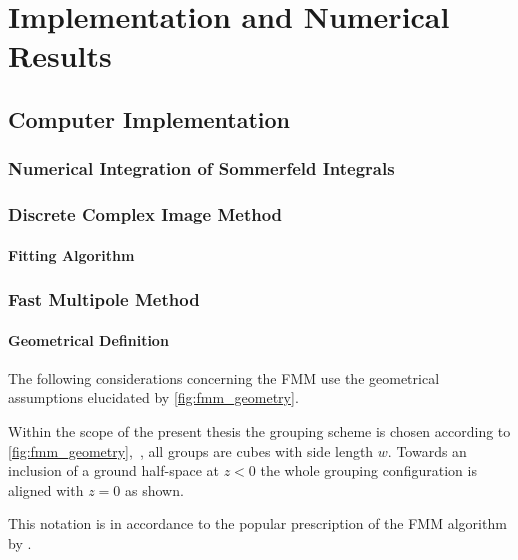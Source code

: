 \part{Implementation and Numerical Results}






\chapter{Computer Implementation}

\section{Numerical Integration of Sommerfeld Integrals}

\section{Discrete Complex Image Method}

\subsection{Fitting Algorithm}

\cite{Hua1989}
\cite{Sarkar1995}
\cite{mohammadi-ghazi2016}
\cite{vandenberg2008, spgl1site}

\section{Fast Multipole Method}

\subsection{Geometrical Definition}

The following considerations concerning the \ac{FMM} use the geometrical
assumptions elucidated by \cref{fig:fmm_geometry}.



Within the scope of the present thesis the grouping scheme is chosen
according to \cref{fig:fmm_geometry},~\ie, all groups are cubes with side
length $w$.
Towards an inclusion of a ground half-space at $z < 0$ the whole grouping
configuration is aligned with $z = 0$ as shown.



This notation is in accordance to the popular prescription of the \ac{FMM}
algorithm by \textcite{Coifman1993}.

